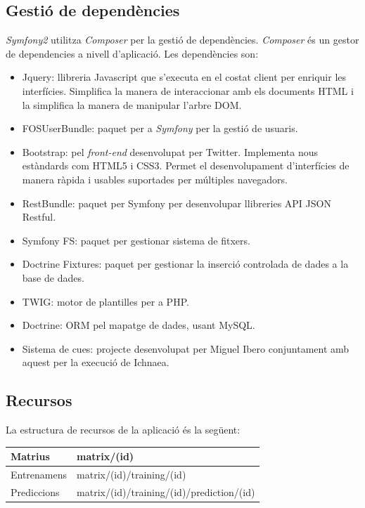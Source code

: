 \subsection{Gesti\'{o} de depend\`{e}ncies} 
\textit{Symfony2} utilitza \textit{Composer} per la gesti\'{o} de depend\`{e}ncies.\cite{composer} \textit{Composer} \'{e}s un gestor de dependencies a nivell d'aplicaci\'{o}. Les depend\`{e}ncies son:
\begin{itemize}
\item Jquery: llibreria Javascript que s'executa en el costat client per enriquir les interfícies. Simplifica la manera de interaccionar amb els documents HTML i la simplifica la manera de manipular l'arbre DOM.\cite{jquery}
\item FOSUserBundle: paquet per a \textit{Symfony} per la gesti\'{o} de usuaris.\cite{fosuserbundle}
\item Bootstrap:  pel \textit{front-end} desenvolupat per Twitter. Implementa nous estàndards com HTML5 i CSS3. Permet el desenvolupament d'interf\'{i}cies de manera r\`{a}pida i usables suportades per múltiples navegadors.
\item RestBundle: paquet per Symfony per desenvolupar llibreries API JSON Restful.\cite{apijson}
\item Symfony FS: paquet per gestionar sistema de fitxers.
\item Doctrine Fixtures: paquet per gestionar la inserci\'{o} controlada de dades a la base de dades.
\item TWIG: motor de plantilles per a PHP.\cite{twig}
\item Doctrine: ORM pel mapatge de dades, usant MySQL.\cite{mysql}
\item Sistema de cues: projecte desenvolupat per Miguel Ibero conjuntament amb aquest per la execució de Ichnaea.
\end{itemize}

\subsection{Recursos}
La estructura de recursos de la aplicaci\'{o} \'{e}s la següent:\\

\begin{tabular}{| l | l |}
\hline
Matrius     & matrix/(id) \\ \hline
Entrenamens & matrix/(id)/training/(id) \\ \hline
Prediccions & matrix/(id)/training/(id)/prediction/(id) \\ \hline
\end{tabular}\\

